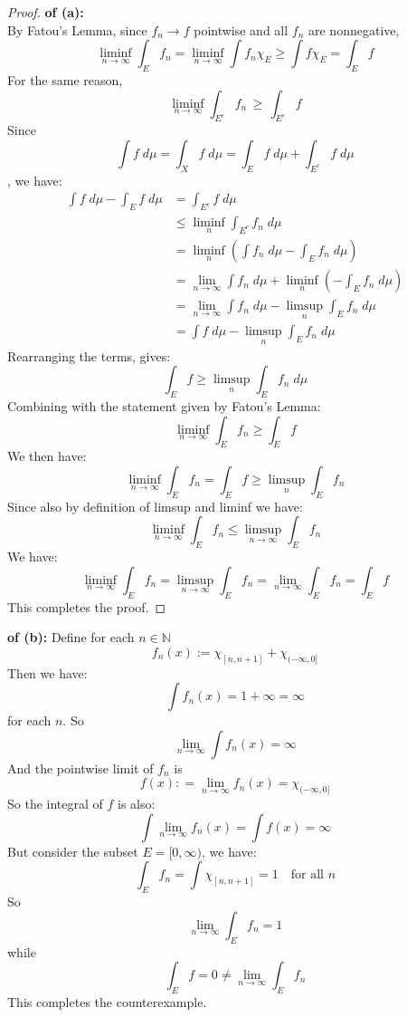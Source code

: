 \documentclass[lang=cn,11pt]{elegantbook}
\begin{document}
\begin{proof}
    \textbf{of (a):} \\
    By Fatou’s Lemma, since \(f_n \to f\) pointwise and all \(f_n\) are nonnegative,
\[
\liminf_{n\to\infty} \int_E f_n    =    \liminf_{n\to\infty} \int f_n \chi_E  \geq \int f\chi_E  =
\int_E f
\]
For the same reason, \[
     \liminf_{n\to\infty} \int_{E^c} f_n \,\ge\, \int_{E^c} f
   \]
Since \[
\int f \; d\mu = \int _X f \; d\mu  = \int _E f \; d\mu + \int _{E^c} f\; d\mu
\], we have: \begin{align}
    \int  f \; d\mu - \int _E f \; d\mu &= \int _{E^c} f \; d\mu \\
     &\leq \liminf_n \int_{E^c} f_n \; d\mu \\
     &= \liminf_n (\int f_n \; d\mu - \int_E f_n \;d \mu)\\
     & = \lim_{n \rightarrow \infty} \int f_n \; d\mu +  \liminf_n (-\int_E f_n \;d \mu) \\
     & = \lim_{n \rightarrow \infty} \int f_n \; d\mu - \limsup_n \int_E f_n \;d \mu \\
     & = \int f \; d\mu - \limsup_{n} \int_E f_n \;d \mu
\end{align}
Rearranging the terms, gives: \[
\int _E f  \geq \limsup_n \int_E f_n \;d \mu
\]
Combining with the statement given by Fatou's Lemma: \[
\liminf_{n\to\infty} \int_E f_n      \geq  
\int_E f
\]
We then have: 
\[
    \liminf_{n\to\infty} \int_E f_n =\int_E f \geq  \limsup_n \int_E f_n
   \]
Since also by definition of limsup and liminf we have: \[
\liminf_{n\to\infty} \int_E f_n \leq \limsup_{n\to\infty} \int_E f_n
\]
We have:  \[
\liminf_{n\to\infty} \int_E f_n  =  \limsup_{n\to\infty} \int_E f_n =  \lim_{n\to\infty} \int_E f_n = \int_E f
\]
This completes the proof.
\end{proof}
\begin{solution}
    \textbf{of (b):}
Define for each $n \in \mathbb{N}$ \[
f_n(x) := \chi_{[n,n+1]}  + \chi_{(-\infty, 0]}
\]
Then we have: \[
\int f_n(x) = 1 + \infty = \infty 
\]
for each $n$. So \[
\lim_{n\to\infty} \int f_n(x) = \infty
\]
And the pointwise limit of $f_n$ is \[
f(x) : = \lim_{n\to \infty} f_n(x) =   \chi_{(-\infty, 0]} \]
So the integral of $f$ is also: \[
\int \lim_{n\to \infty} f_n(x) = \int f(x) = \infty
\]
But consider the subset $E = [0,\infty)$, we have: \[
\int_E f_n  = \int \chi_{[n,n+1]}  = 1 \quad \text{for all } n
\]
So \[
\lim_{n\rightarrow \infty} \int_E f_n  = 1
\]while \[
\int_E f = 0 \not = \lim_{n\rightarrow \infty} \int_E f_n
\]
This completes the counterexample.
\end{solution}
\end{document}
